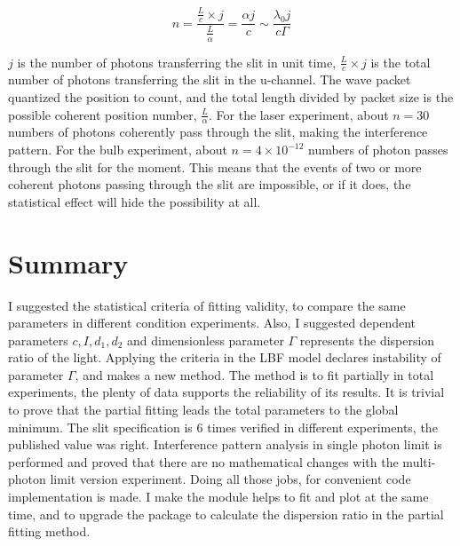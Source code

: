\documentclass{article}
\begin{document}
\begin{equation}
  n = \frac{ \frac{L}{c} \times j }{\frac{L}{\alpha}} = \frac{\alpha j}{c} \sim  \frac{\lambda_0 j}{c \Gamma}
\end{equation}

$j$ is the number of photons transferring the slit in unit time, $\frac{L}{c} \times j $ is the total number of photons transferring the slit in the u-channel.
The wave packet quantized the position to count, and the total length divided by packet size is the possible coherent position number, $\frac{L}{\alpha}$.
For the laser experiment, about $n = 30$ numbers of photons coherently pass through the slit, making the interference pattern.
For the bulb experiment, about $n = 4 \times 10^{-12}$ numbers of photon passes through the slit for the moment.
This means that the events of two or more coherent photons passing through the slit are impossible, or if it does, the statistical effect will hide the possibility at all.

\section{Summary}
I suggested the statistical criteria of fitting validity, to compare the same parameters in different condition experiments.
Also, I suggested dependent parameters $c, I,d_1, d_2$ and dimensionless parameter $\Gamma$ represents the dispersion ratio of the light.
Applying the criteria in the LBF model declares instability of parameter $\Gamma$, and makes a new method.
The method is to fit partially in total experiments, the plenty of data supports the reliability of its results.
It is trivial to prove that the partial fitting leads the total parameters to the global minimum.
The slit specification is 6 times verified in different experiments, the published value was right.
Interference pattern analysis in single photon limit is performed and proved that there are no mathematical changes with the multi-photon limit version experiment.
Doing all those jobs, for convenient code implementation is made.
I make the module helps to fit and plot at the same time, and to upgrade the package to calculate the dispersion ratio in the partial fitting method.





\end{document}
